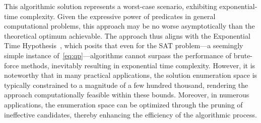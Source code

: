 This algorithmic solution represents a worst-case scenario, exhibiting exponential-time complexity. Given the expressive power of predicates in general computational problems,
this approach may be no worse asymptotically than
the theoretical optimum achievable.
The approach thus
aligns with the Exponential Time Hypothesis~\citep{SETH}, which posits that even for the SAT problem—a seemingly simple instance of~\cref{eq:qp}—algorithms cannot surpass the performance of brute-force methods, inevitably resulting in exponential time complexity. 
However, it is noteworthy that in many practical applications, the solution enumeration space is typically constrained to a magnitude of a few hundred thousand, rendering the approach computationally feasible within these bounds. Moreover, in numerous applications, the enumeration space can be optimized through the pruning of ineffective candidates, thereby enhancing the efficiency of the algorithmic process.






